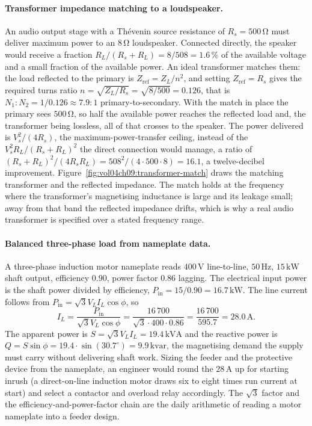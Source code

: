 \paragraph{Transformer impedance matching to a loudspeaker.}
An audio output stage with a Th\'evenin source resistance of $R_{s} =
500\,\si{\ohm}$ must deliver maximum power to an $8\,\si{\ohm}$ loudspeaker.
Connected directly, the speaker would receive a fraction $R_{L}/(R_{s}+R_{L})
= 8/508 = 1.6\,\%$ of the available voltage and a small fraction of the
available power. An ideal transformer matches them: the load reflected to the
primary is $Z_{\text{ref}} = Z_{L}/n^{2}$, and setting $Z_{\text{ref}} =
R_{s}$ gives the required turns ratio $n = \sqrt{Z_{L}/R_{s}} = \sqrt{8/500} =
0.126$, that is $N_{1}:N_{2} = 1/0.126 \approx 7.9:1$ primary-to-secondary.
With the match in place the primary sees $500\,\si{\ohm}$, so half the
available power reaches the reflected load and, the transformer being
lossless, all of that crosses to the speaker. The power delivered is
$V_{s}^{2}/(4R_{s})$, the maximum-power-transfer ceiling, instead of the
$V_{s}^{2}R_{L}/(R_{s}+R_{L})^{2}$ the direct connection would manage, a
ratio of $(R_{s}+R_{L})^{2}/(4R_{s}R_{L}) = 508^{2}/(4\cdot 500\cdot 8) =
16.1$, a twelve-decibel improvement. Figure~\ref{fig:vol04ch09:transformer-match}
draws the matching transformer and the reflected impedance. The match holds at
the frequency where the transformer's magnetising inductance is large and its
leakage small; away from that band the reflected impedance drifts, which is
why a real audio transformer is specified over a stated frequency range.

\paragraph{Balanced three-phase load from nameplate data.}
A three-phase induction motor nameplate reads $400\,\si{\volt}$ line-to-line,
$50\,\si{\hertz}$, $15\,\si{\kilo\watt}$ shaft output, efficiency $0.90$,
power factor $0.86$ lagging. The electrical input power is the shaft power
divided by efficiency, $P_{\text{in}} = 15/0.90 = 16.7\,\si{\kilo\watt}$. The
line current follows from $P_{\text{in}} = \sqrt{3}V_{L}I_{L}\cos\phi$, so
\[
I_{L} = \frac{P_{\text{in}}}{\sqrt{3}V_{L}\cos\phi}
= \frac{16\,700}{\sqrt{3}\cdot 400\cdot 0.86}
= \frac{16\,700}{595.7}
= 28.0\,\si{\ampere}.
\]
The apparent power is $S = \sqrt{3}V_{L}I_{L} = 19.4\,\si{\kilo\volt\ampere}$
and the reactive power is $Q = S\sin\phi = 19.4\cdot\sin(30.7^\circ) =
9.9\,\text{kvar}$, the magnetising demand the supply must carry without
delivering shaft work. Sizing the feeder and the protective device from the
nameplate, an engineer would round the $28\,\si{\ampere}$ up for starting
inrush (a direct-on-line induction motor draws six to eight times run current
at start) and select a contactor and overload relay accordingly. The
$\sqrt{3}$ factor and the efficiency-and-power-factor chain are the daily
arithmetic of reading a motor nameplate into a feeder design.

